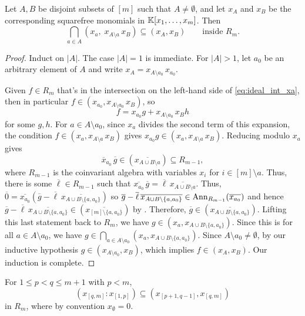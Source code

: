 \begin{lemma}
\label{lem:endpoint-intersection-proofonly}
Let $A, B$ be disjoint subsets of $[m]$ such that $A\neq \emptyset$, and let $x_{A}$ and $x_{B}$ be the corresponding squarefree monomials in $\mathbb{K}[x_1,\dots,x_m]$.
Then 
\begin{equation}\label{eq:ideal_int_xa}
    \bigcap_{a\in A}\left(x_{a},\;x_{A\setminus a}\,x_B\right) \subseteq (x_A,x_B)\qquad\text{inside }R_m.
\end{equation}
\end{lemma}

\begin{proof}
Induct on $|A|$.  
The case $|A|=1$ is immediate. 
For $|A|>1$, let $a_0$ be an arbitrary element of $A$ and write $x_A=x_{A\setminus a_0}\, x_{a_0}$. 

Given $f\in R_m$ that's in the intersection on the left-hand side of \eqref{eq:ideal_int_xa}, then in particular $f\in (x_{a_0},x_{A\setminus a_0}\,x_B)$, so
\[f=x_{a_0}g+x_{A\setminus a_0}\,x_Bh\]
for some $g,h$. 
For $a\in A\setminus a_0$, since $x_{a}$ divides the second term of this expansion, the condition $f\in(x_{a},x_{A\setminus a}\,x_B)$ gives $x_{a_0}g\in(x_{a},x_{A\setminus a}\,x_B)$. Reducing modulo $x_{a}$ gives
\[ 
\overline x_{a_0}\,\overline g\in (\overline{x_{A\cup B\setminus a}}) \subseteq R_{m-1}, 
\]
where $R_{m-1}$ is the coinvariant algebra with variables $x_i$ for $i\in [m]\setminus a$. Thus, there is some $\overline{\ell}\in R_{m-1}$ such that $\overline{x_{a_0}}\,\overline{g} = \overline{\ell}\,\overline{x_{A\cup B\setminus a}}$. Thus, $\overline{0} = \overline{x_{a_0}}(\overline{g}-\overline{\ell}\,\overline{x_{A\cup B\setminus\{a,a_0\}}})$ so $\overline{g}-\overline{\ell}\,\overline{x_{A\cup B\setminus\{a,a_0\}}}\in \operatorname{Ann}_{R_{m-1}}(\overline{x_{a_0}})$ and hence $\overline{g}-\overline{\ell}\,\overline{x_{A\cup B\setminus\{a,a_0\}}}\in (\overline{x_{[m]\setminus\{a,a_0\}}})$ by . Therefore, $\overline{g}\in (\overline{x_{A\cup B\setminus \{a,a_0\}}})$. Lifting this last statement back to $R_m$, we have $g \in (x_a,x_{A\cup B\setminus \{a,a_0\}})$. Since this is for all $a\in A\setminus a_0$, we have $g\in \bigcap_{a\in A\setminus a_0} (x_a,x_{A\cup B\setminus \{a,a_0\}})$. Since $A\setminus a_0\neq \emptyset$, by our inductive hypothesis $g\in (x_{A\setminus a_0},x_B)$, which implies $f\in (x_A,x_B)$. Our induction is complete.
\end{proof}

\begin{lemma}
\label{lem:local-endpoint-colon-proofonly}
For $1\leq p<q\leq m+1$ with $p<m$,
\[(x_{[q,m]}:x_{[1,p]})\subseteq(x_{[p+1,q-1]},x_{[q,m]})\]
in $R_m$, where by convention $x_{\emptyset}=0$.
\end{lemma}

